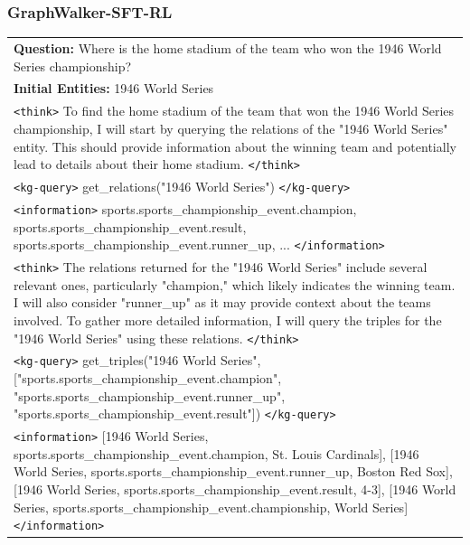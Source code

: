 \subsubsection{GraphWalker-SFT-RL}

{\scriptsize
\setlength{\arrayrulewidth}{0.3pt}
\setlength{\tabcolsep}{8pt}
\renewcommand{\arraystretch}{1.3}
\begin{longtable}{>{\raggedright\arraybackslash}p{}}
\toprule
\rowcolor{gray!20}
\textbf{Question:} Where is the home stadium of the team who won the 1946 World Series championship? \\
\rowcolor{gray!20}
\textbf{Initial Entities:} 1946 World Series \\
\midrule
\rowcolor{blue!10}
\texttt{<think>} To find the home stadium of the team that won the 1946 World Series championship, I will start by querying the relations of the "1946 World Series" entity. This should provide information about the winning team and potentially lead to details about their home stadium. \texttt{</think>} \\
\rowcolor{green!10}
\texttt{<kg-query>} get\_relations("1946 World Series") \texttt{</kg-query>} \\
\rowcolor{yellow!10}
\texttt{<information>} sports.sports\_championship\_event.champion, sports.sports\_championship\_event.result, sports.sports\_championship\_event.runner\_up, ... \texttt{</information>} \\
\rowcolor{blue!10}
\texttt{<think>} The relations returned for the "1946 World Series" include several relevant ones, particularly "champion," which likely indicates the winning team. I will also consider "runner\_up" as it may provide context about the teams involved. To gather more detailed information, I will query the triples for the "1946 World Series" using these relations. \texttt{</think>} \\
\rowcolor{green!10}
\texttt{<kg-query>} get\_triples("1946 World Series", ["sports.sports\_championship\_event.champion", "sports.sports\_championship\_event.runner\_up", "sports.sports\_championship\_event.result"]) \texttt{</kg-query>} \\
\rowcolor{yellow!10}
\texttt{<information>} [1946 World Series, sports.sports\_championship\_event.champion, St. Louis Cardinals], [1946 World Series, sports.sports\_championship\_event.runner\_up, Boston Red Sox], [1946 World Series, sports.sports\_championship\_event.result, 4-3], [1946 World Series, sports.sports\_championship\_event.championship, World Series] \texttt{</information>} \\

\end{longtable}}
